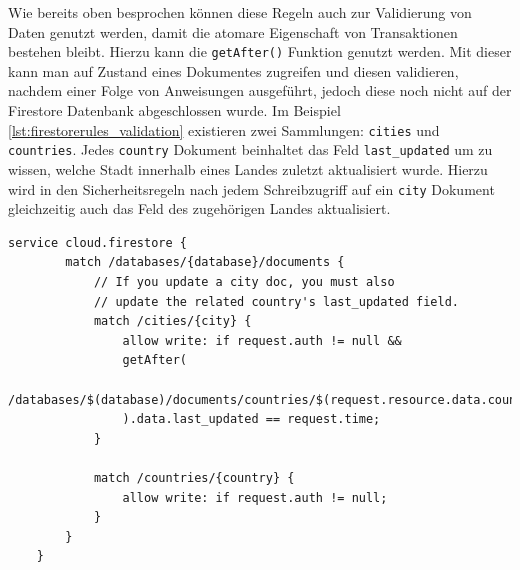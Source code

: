 Wie bereits oben besprochen können diese Regeln auch zur Validierung von Daten genutzt werden, damit die atomare Eigenschaft von Transaktionen bestehen bleibt.
Hierzu kann die \texttt{getAfter()} Funktion genutzt werden. 
Mit dieser kann man auf Zustand eines Dokumentes zugreifen und diesen validieren, nachdem einer Folge von Anweisungen ausgeführt, jedoch diese noch nicht auf der Firestore Datenbank abgeschlossen wurde.
Im Beispiel \ref{lst:firestorerules_validation} existieren zwei Sammlungen: \texttt{cities} und \texttt{countries}. 
Jedes \texttt{country} Dokument beinhaltet das Feld \texttt{last\_updated} um zu wissen, welche Stadt innerhalb eines Landes zuletzt aktualisiert wurde.
Hierzu wird in den Sicherheitsregeln nach jedem Schreibzugriff auf ein \texttt{city} Dokument gleichzeitig auch das Feld des zugehörigen Landes aktualisiert.\cite{firebase2021}
\medskip
\begin{lstlisting}[caption=Datenvalidierung für atomare Operationen, label=lst:firestorerules_validation]
	service cloud.firestore {
		match /databases/{database}/documents {
			// If you update a city doc, you must also
			// update the related country's last_updated field.
			match /cities/{city} {
				allow write: if request.auth != null &&
				getAfter(
				/databases/$(database)/documents/countries/$(request.resource.data.country)
				).data.last_updated == request.time;
			}
			
			match /countries/{country} {
				allow write: if request.auth != null;
			}
		}
	}
\end{lstlisting}
\medskip

